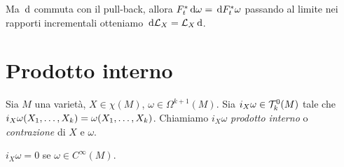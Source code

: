 Ma $\de$ commuta con il pull-back, allora $F_t^* \de\omega = \de F_t^* \omega$ passando al limite nei rapporti incrementali otteniamo $\de \Lie_X = \Lie_X \de$.

\section{Prodotto interno}
\begin{definition}
	Sia $M$ una varietà, $X\in\chi(M)$, $\omega\in\Omega^{k+1}(M)$. Sia $i_X\omega \in \Tau_k^0(M)$ tale che $i_X\omega(\seqb Xk,) = \omega(\seqb Xk,)$. Chiamiamo $i_X\omega$ \emph{prodotto interno} o \emph{contrazione} di $X$ e $\omega$.
\end{definition}

\begin{remark}
	$i_X\omega = 0$ se $\omega\in C^\infty(M)$.
\end{remark}

